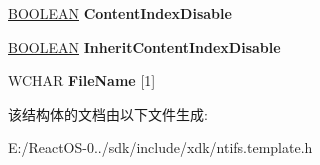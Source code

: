 \begin{DoxyCompactItemize}
\item 
\mbox{\label{struct___f_i_l_e___o_l_e___d_i_r___i_n_f_o_r_m_a_t_i_o_n_acdf568ba808a5c9795d6f3f4bc85fd59}} 
\hyperlink{_processor_bind_8h_a112e3146cb38b6ee95e64d85842e380a}{B\+O\+O\+L\+E\+AN} {\bfseries Content\+Index\+Disable}
\item 
\mbox{\label{struct___f_i_l_e___o_l_e___d_i_r___i_n_f_o_r_m_a_t_i_o_n_a01726131a4a9d65ae04f2f06537c78f2}} 
\hyperlink{_processor_bind_8h_a112e3146cb38b6ee95e64d85842e380a}{B\+O\+O\+L\+E\+AN} {\bfseries Inherit\+Content\+Index\+Disable}
\item 
\mbox{\label{struct___f_i_l_e___o_l_e___d_i_r___i_n_f_o_r_m_a_t_i_o_n_a7c2093db1601d42e87f2a7f25f2a1e31}} 
W\+C\+H\+AR {\bfseries File\+Name} \mbox{[}1\mbox{]}
\end{DoxyCompactItemize}


该结构体的文档由以下文件生成\+:\begin{DoxyCompactItemize}
\item 
E\+:/\+React\+O\+S-\/0../sdk/include/xdk/ntifs.\+template.\+h\end{DoxyCompactItemize}
